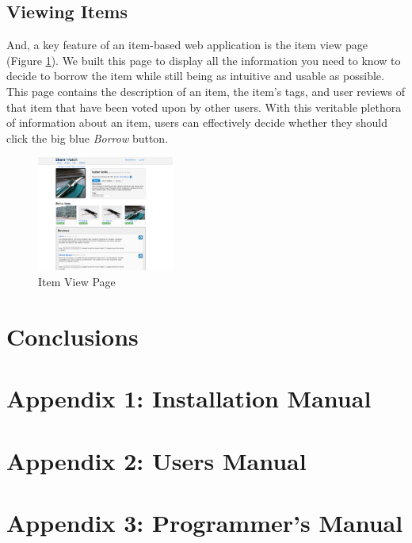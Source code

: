 \documentclass{acm_proc_article-sp}
\begin{document}
\subsection{Viewing Items}
And, a key feature of an item-based web application is the item view page (Figure \ref{fig:ItemView.png}). 
We built this page to display all the information
you need to know to decide to borrow the item while still being as intuitive and usable as possible. This page contains
the description of an item, the item's tags, and user reviews of that item that have been voted upon by other users.
With this veritable plethora of information about an item, users can effectively decide whether they should click the
big blue \textit{Borrow} button.

\begin{figure}[h]
\begin{centering}
\includegraphics[width=0.4\textwidth]{ItemView.png}
\caption{Item View Page}
\label{fig:ItemView.png}
\end{centering}
\end{figure}


\section{Conclusions}
\section{Appendix 1: Installation Manual}
\section{Appendix 2: Users Manual}
\section{Appendix 3: Programmer's Manual}
\end{document}
